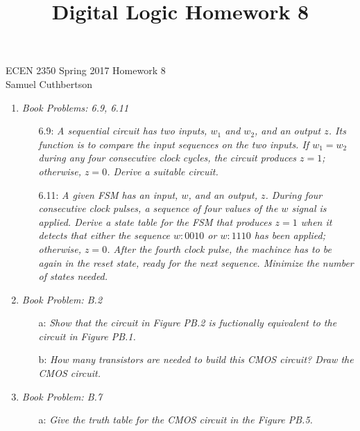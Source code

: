 \documentclass[12pt]{article}
\begin{document}
\makeatother

\title{Digital Logic Homework 8}

ECEN 2350 Spring 2017 \hfill Homework 8\\
Samuel Cuthbertson

\hrulefill{}
\begin{enumerate}
  \item \textit{Book Problems: 6.9, 6.11}
  \begin{enumerate}
    \item[6.9:] \textit{A sequential circuit has two inputs, $w_1$ and $w_2$, and an output $z$. Its function is to compare the input sequences on the two inputs. If $w_1 = w_2$ during any four consecutive clock cycles, the circuit produces $z=1$; otherwise, $z=0$. Derive a suitable circuit.}

    \item[6.11:] \textit{A given FSM has an input, $w$, and an output, $z$. During four consecutive clock pulses, a sequence of four values of the $w$ signal is applied. Derive a state table for the FSM that produces $z=1$ when it detects that either the sequence $w:0010$ or $w:1110$ has been applied; otherwise, $z=0$. After the fourth clock pulse, the machince has to be again in the reset state, ready for the next sequence. Minimize the number of states needed.}

  \end{enumerate}

  \newpage
  \item \textit{Book Problem: B.2}
  \begin{enumerate}
    \item[a:] \textit{Show that the circuit in Figure PB.2 is fuctionally equivalent to the circuit in Figure PB.1.}



    \item[b:] \textit{How many transistors are needed to build this CMOS circuit? Draw the CMOS circuit.}
  \end{enumerate}

  \newpage
  \item \textit{Book Problem: B.7}
  \begin{enumerate}
    \item[a:] \textit{Give the truth table for the CMOS circuit in the Figure PB.5.}


\end{enumerate}
\end{enumerate}
\end{document}
